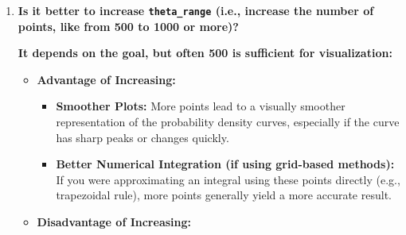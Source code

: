 \documentclass[11pt]{article}
\providecommand{\tightlist}{%
      \setlength{\itemsep}{0pt}\setlength{\parskip}{0pt}}
\begin{document}
\begin{enumerate}
\begin{itemize}
    \begin{itemize}
    \tightlist
    \item
      \textbf{Calculating:} Evaluating the Prior PDF, Likelihood
      function, and Posterior PDF at these specific points.
    \item
      \textbf{Plotting:} Using these calculated values to draw smooth
      curves representing the distributions. The more points, the
      smoother the curve appears.
    \item
      \textbf{Numerical Approximation (Sometimes):} If analytical
      solutions weren't available, we might use these points for
      numerical integration (like calculating the evidence \$
      p(D\textbar M) \$ using methods like the trapezoidal rule).
    \end{itemize}
  \end{itemize}

  Think of it like pixels on a screen: the screen uses a finite number
  of pixels to represent a potentially continuous image.
  \texttt{theta\_range} is like the set of x-coordinates for the
  ``pixels'' we use to draw our probability distributions. The actual
  distributions (prior, posterior) are conceptually defined over the
  continuous {[}0, 1{]} range.
\item
  \textbf{Is it better to increase \texttt{theta\_range} (i.e., increase
  the number of points, like from 500 to 1000 or more)?}

  \textbf{It depends on the goal, but often 500 is sufficient for
  visualization:}

  \begin{itemize}
  \tightlist
  \item
    \textbf{Advantage of Increasing:}

    \begin{itemize}
    \tightlist
    \item
      \textbf{Smoother Plots:} More points lead to a visually smoother
      representation of the probability density curves, especially if
      the curve has sharp peaks or changes quickly.
    \item
      \textbf{Better Numerical Integration (if using grid-based
      methods):} If you were approximating an integral using these
      points directly (e.g., trapezoidal rule), more points generally
      yield a more accurate result.
    \end{itemize}
  \item
    \textbf{Disadvantage of Increasing:}


\end{itemize}
\end{enumerate}
\end{document}
